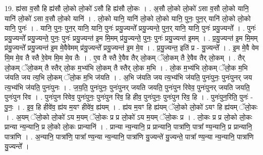 \documentclass[17pt]{extarticle}
\begin{document}
19. ह्य॑सा व॒सौ हि ह्य॑सौ लो॒को लो॒को॑ ऽसौ हि ह्य॑सौ लो॒कः । . अ॒सौ लो॒को लो॒को॑ ऽसा व॒सौ लो॒को यानि॒ यानि॑ लो॒को॑ ऽसा व॒सौ लो॒को यानि॑ । . लो॒को यानि॒ यानि॑ लो॒को लो॒को यानि॒ पुनः॒ पुन॒र् यानि॑ लो॒को लो॒को यानि॒ पुनः॑ । . यानि॒ पुनः॒ पुन॒र् यानि॒ यानि॒ पुनः॑ प्रयु॒ज्यन्ते᳚ प्रयु॒ज्यन्ते॒ पुन॒र् यानि॒ यानि॒ पुनः॑ प्रयु॒ज्यन्ते᳚ । . पुनः॑ प्रयु॒ज्यन्ते᳚ प्रयु॒ज्यन्ते॒ पुनः॒ पुनः॑ प्रयु॒ज्यन्त॑ इ॒म मि॒मम् प्र॑यु॒ज्यन्ते॒ पुनः॒ पुनः॑ प्रयु॒ज्यन्त॑ इ॒मम् । . प्र॒यु॒ज्यन्त॑ इ॒म मि॒मम् प्र॑यु॒ज्यन्ते᳚ प्रयु॒ज्यन्त॑ इ॒म मे॒वैवेमम् प्र॑यु॒ज्यन्ते᳚ प्रयु॒ज्यन्त॑ इ॒म मे॒व । . प्र॒यु॒ज्यन्त॒ इति॑ प्र - यु॒ज्यन्ते᳚ । . इ॒म मे॒वै वेम मि॒म मे॒व तै स्तै रे॒वेम मि॒म मे॒व तैः । . ए॒व तै स्तै रे॒वैव तैर् लो॒कम् ॅलो॒कम् तै रे॒वैव तैर् लो॒कम् । . तैर् लो॒कम् ॅलो॒कम् तै स्तैर् लो॒क म॒भ्य॑भि लो॒कम् तै स्तैर् लो॒क म॒भि । . लो॒क म॒भ्य॑भि लो॒कम् ॅलो॒क म॒भि ज॑यति जय त्य॒भि लो॒कम् ॅलो॒क म॒भि ज॑यति । . अ॒भि ज॑यति जय त्य॒भ्य॑भि ज॑यति॒ पुनः॑पुनः॒ पुनः॑पुनर् जय त्य॒भ्य॑भि ज॑यति॒ पुनः॑पुनः । . ज॒य॒ति॒ पुनः॑पुनः॒ पुनः॑पुनर् जयति जयति॒ पुनः॑पुन रिवेव॒ पुनः॑पुनर् जयति जयति॒ पुनः॑पुन रिव । . पुनः॑पुन रिवेव॒ पुनः॑पुनः॒ पुनः॑पुन रिव॒ हि हीव॒ पुनः॑पुनः॒ पुनः॑पुन रिव॒ हि । . पुनः॑पुन॒रिति॒ पुनः॑ - पु॒नः॒ । . इ॒व॒ हि हीवे॑व॒ ह्य॑य म॒यꣳ हीवे॑व॒ ह्य॑यम् । . ह्य॑य म॒यꣳ हि ह्य॑यम् ॅलो॒को लो॒को॑ ऽयꣳ हि ह्य॑यम् ॅलो॒कः । . अ॒यम् ॅलो॒को लो॒को॑ ऽय म॒यम् ॅलो॒कः प्र प्र लो॒को॑ ऽय म॒यम् ॅलो॒कः प्र । . लो॒कः प्र प्र लो॒को लो॒कः प्रान्या न्य॒न्यानि॒ प्र लो॒को लो॒कः प्रान्यानि॑ । . प्रान्या न्य॒न्यानि॒ प्र प्रान्यानि॒ पात्रा॑णि॒ पात्रा᳚ ण्य॒न्यानि॒ प्र प्रान्यानि॒ पात्रा॑णि । . अ॒न्यानि॒ पात्रा॑णि॒ पात्रा᳚ ण्य॒न्या न्य॒न्यानि॒ पात्रा॑णि यु॒ज्यन्ते॑ यु॒ज्यन्ते॒ पात्रा᳚ ण्य॒न्या न्य॒न्यानि॒ पात्रा॑णि यु॒ज्यन्ते᳚ । \newline
\end{document}
